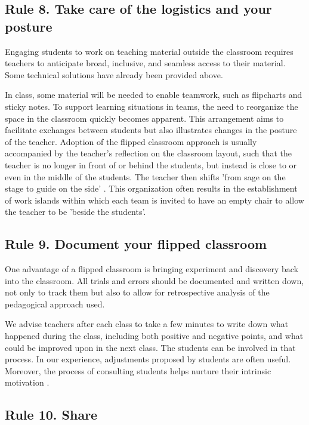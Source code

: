 \documentclass[10pt,letterpaper]{article}
\begin{document}
\subsection{Rule 8. Take care of the logistics and your posture}

Engaging students to work on teaching material outside the classroom requires teachers to anticipate broad, inclusive, and seamless access to their material. Some technical solutions have already been provided above.

In class, some material will be needed to enable teamwork, such as flipcharts and sticky notes. 
To support learning situations in teams, the need to reorganize the space in the classroom quickly becomes apparent. 
This arrangement aims to facilitate exchanges between students but also illustrates changes in the posture of the teacher. 
Adoption of the flipped classroom approach is usually accompanied by the teacher’s reflection on the classroom layout, such that the teacher is no longer in front of or behind the students, but instead is close to or even in the middle of the students. 
The teacher then shifts 'from sage on the stage to guide on the side' \cite{king_sage_1993}. 
This organization often results in the establishment of work islands within which each team is invited to have an empty chair to allow the teacher to be 'beside the students'.


\subsection{Rule 9. Document your flipped classroom}

One advantage of a flipped classroom is bringing experiment and discovery back into the classroom. All trials and errors should be documented and written down, not only to track them but also to allow for retrospective analysis of the pedagogical approach used.

We advise teachers after each class to take a few minutes to write down what happened during the class, including both positive and negative points, and what could be improved upon in the next class. The students can be involved in that process. 
In our experience, adjustments proposed by students are often useful. Moreover, the process of consulting students helps nurture their intrinsic motivation \cite{oraif2018investigation,thai_impact_2017}.


\subsection{Rule 10. Share}
\end{document}
